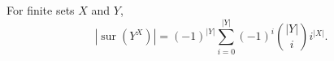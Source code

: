 For finite sets $X$ and $Y$,
$$|\operatorname{sur}(Y^X)| = (-1)^{|Y|} \sum_{i=0}^{|Y|} (-1)^i \binom{|Y|}{i} i^{|X|}.$$
